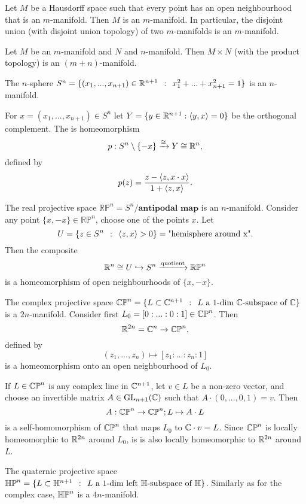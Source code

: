 \documentclass[a4paper,11pt,english]{article}
\begin{document}
\begin{exmp}
Let $M$ be a Hausdorff space such that every point has an open neighbourhood that is an $m$-manifold.
Then $M$ is an $m$-manifold. In particular, the disjoint union (with disjoint union topology)
of two $m$-manifolds is an $m$-manifold.
\end{exmp} 

\begin{exmp}
Let  $M$ be an $m$-manifold and $N$ and $n$-manifold. Then $M\times N$ (with the product topology)
is an $(m+n)$-manifold. 
\end{exmp}

\begin{exmp}
The $n$-sphere $S^n = \{(x_1, ..., x_{n+1}) \in \mathbb{R}^{n+1} \:\::\:\: x_1^2 + ... + x_{n+1}^2 = 1 \}$ is an $n$-manifold.
\end{exmp}


For $x =(x_1, ..., x_{n+1}) \in S^n$ let $Y = \{ y \in \mathbb{R}^{n+1} : \langle y,x \rangle = 0\}$ be the orthogonal complement. The  is homeomorphism 
\[ p: S^n\setminus\{-x\} \xrightarrow{\cong} Y \cong \mathbb{R}^{n}, \]
defined by 
\[ p(z) = \frac{z - \langle z,x \cdot x \rangle}{1 + \langle z,x \rangle}. \] 


\begin{exmp}
\def\RP{\mathbb{RP}}

The real projective space $\RP^n = S^n / \textbf{antipodal map}$ is an $n$-manifold.
Consider any point $\{x, -x\} \in \RP^n$, choose one of the points $x$. Let 
\[ U = \{ z \in S^n \:\::\:\: \langle z,x \rangle > 0\} = \text{"hemisphere around x"}. \]
Then the composite
\[ \R^n \cong U \hookrightarrow S^n \xrightarrow{\text{quotient}} \RP^n \]
is a homeomorphism of open neighbourhoods of $\{x,-x\}$.
\end{exmp}

\begin{exmp}

The complex projective space $\mathbb{CP}^n = \{ L \subset \mathbb{C}^{n+1} \:\::\:\: L \text{ a } 1\text{-dim } \mathbb{C}\text{-subspace of } \mathbb{C} \}$ is a $2n$-manifold. Consider first $L_0 = [0:...:0:1] \in \mathbb{CP}^n$.
Then 
\[ \mathbb{R}^{2n} = \mathbb{C}^n \to \mathbb{CP}^n, \]
defined by
\[ (z_1, ..., z_n) \mapsto [z_1 : ... : z_n : 1] \]
is a homeomorphism onto an open neighbourhood of $L_0$.

If $L\in \mathbb{CP}^n$ is any complex line in $\mathbb{C}^{n+1}$, let $v\in L$ be a non-zero vector, and choose an invertible matrix $A \in \operatorname{GL}_{n+1}(\mathbb{C})$ such that $A \cdot (0,...,0,1) = v$.
Then
\[ A: \mathbb{CP}^n \to \mathbb{CP}^n; L \mapsto A \cdot L \]
is a self-homomorphism of $\mathbb{CP}^n$ that maps $L_0$ to $\mathbb{C} \cdot v = L$. Since $\mathbb{CP}^n$ is locally homeomorphic to $\mathbb{R}^{2n}$ around $L_0$, is is also locally homeomorphic to $\mathbb{R}^{2n}$ around $L$.
\end{exmp}

\begin{exmp}
The quaternic projective space $\mathbb{HP}^n = \{ L \subset \mathbb{H}^{n+1} \:\::\:\: L \text{ a } 1\text{-dim left } \mathbb{H}\text{-subspace of } \mathbb{H} \}$.
Similarly as for the complex case, $\mathbb{HP}^n$ is a $4n$-manifold.
\end{exmp}
\end{document}
